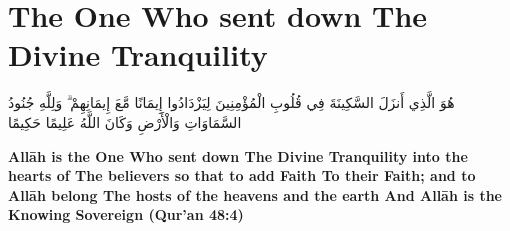 \chapter{The One Who sent down The Divine Tranquility}
\begin{center}
    {\Huge    
        \begin{Arabic}
            هُوَ الَّذِي أَنزَلَ السَّكِينَةَ فِي قُلُوبِ الْمُؤْمِنِينَ لِيَزْدَادُوا إِيمَانًا مَّعَ إِيمَانِهِمْ ۗ وَلِلَّهِ جُنُودُ السَّمَاوَاتِ وَالْأَرْضِ  وَكَانَ اللَّهُ عَلِيمًا حَكِيمًا
        \end{Arabic}
    }
\end{center}
\vspace*{\fill}
\vspace{3cm}
\begin{center}
    \large \textbf{Allāh is the One Who sent down The Divine Tranquility into the hearts of The believers so that to add Faith To their Faith; and to Allāh belong The hosts of the heavens and the earth And Allāh is the Knowing Sovereign (Qur'an 48:4)}
\end{center}
